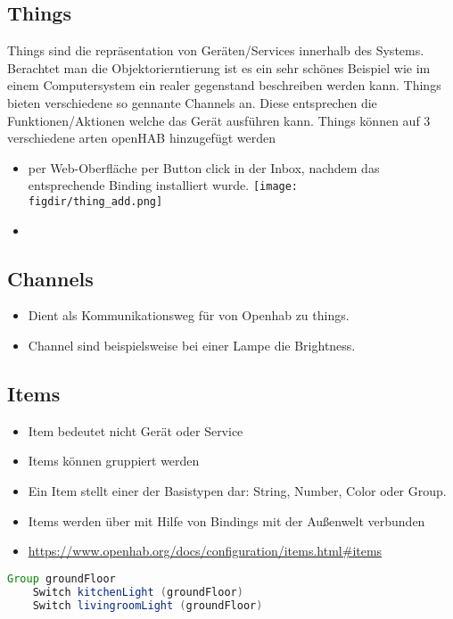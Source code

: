 \subsection{Things}
Things sind die repräsentation von Geräten/Services innerhalb des Systems. Berachtet man die Objektorierntierung ist es ein sehr schönes Beispiel wie im einem Computersystem ein realer gegenstand beschreiben werden kann.
Things bieten verschiedene so gennante Channels an. Diese entsprechen die Funktionen/Aktionen welche das Gerät ausführen kann. 
Things können auf 3 verschiedene arten openHAB hinzugefügt werden
\begin{itemize}
	\item 	per Web-Oberfläche per Button click in der Inbox, nachdem das entsprechende Binding installiert wurde. \texttt{[image: \\figdir/thing\_add.png]}
	\item 
\end{itemize}

\subsection{Channels}
\begin{itemize}
	\item  Dient als Kommunikationsweg für von Openhab zu things.
	\item Channel sind beispielsweise bei einer Lampe die Brightness.
\end{itemize}

\subsection{Items}
\begin{itemize}
	\item Item bedeutet nicht Gerät oder Service
	\item Items können gruppiert werden
	\item Ein Item stellt einer der Basistypen dar: String, Number, Color oder Group.
	\item Items werden über mit Hilfe von Bindings mit der Außenwelt verbunden
	\item \url{https://www.openhab.org/docs/configuration/items.html#items}
\end{itemize}
\begin{lstlisting}[language=java,firstnumber=1,caption=Item-Gruppierung Beispiel,label=lst:group-items]
	Group groundFloor
	Switch kitchenLight (groundFloor)
	Switch livingroomLight (groundFloor)
\end{lstlisting}


